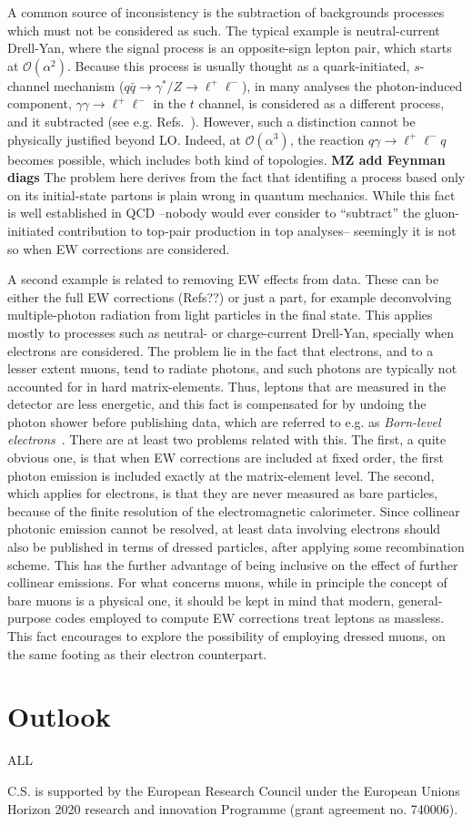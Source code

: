 \documentclass[a4paper,11pt]{article}
\begin{document}
A common source of inconsistency is the subtraction of backgrounds processes which must not be considered as such. The typical example
is neutral-current Drell-Yan, where the signal process is an opposite-sign lepton pair, which starts
at $\mathcal O(\alpha^2)$. Because this process is usually thought
as a quark-initiated, $s$-channel mechanism ($q\bar q \to \gamma^*/Z \to \ell^+ \ell^-$), in many analyses the photon-induced component,
$\gamma \gamma \to \ell^+ \ell^-$ in the $t$ channel, is considered as a different process, and it 
subtracted (see e.g. Refs.~\cite{}). However, such a distinction cannot be physically
justified beyond LO. Indeed, at $\mathcal O(\alpha^3)$, the reaction $q \gamma \to \ell^+ \ell^- q$ becomes possible, which
includes both kind of topologies. {\bf MZ add Feynman diags} The problem here derives from the fact 
that identifing a process based only on its 
initial-state partons is plain wrong in quantum mechanics. While this fact is well established in QCD --nobody would ever 
consider to ``subtract'' the gluon-initiated contribution to top-pair production in top analyses-- seemingly it is not so
when EW corrections are considered.

A second example is related to removing EW effects from data. These can be either the full EW corrections (Refs??) 
or just a part, for example deconvolving multiple-photon radiation from light particles in the final state. This applies mostly
to processes such as neutral- or charge-current Drell-Yan, specially when electrons are considered. The problem lie in the fact that
 electrons, and to a lesser extent muons, tend to radiate photons, and such photons are typically not accounted
for in hard matrix-elements. Thus, leptons that are measured in the detector are less energetic, and this fact is compensated for
by undoing the photon shower before publishing data, which are referred to e.g. as \emph{Born-level electrons}~\cite{}. There are 
at least two 
problems related with this. The first, a quite obvious one, is that when EW corrections
are included at fixed order, the first photon emission is included exactly at the matrix-element level. The second, which
applies for electrons, is that they are never measured as bare particles, because of the finite resolution 
of the electromagnetic calorimeter. Since collinear photonic emission cannot be resolved, at least data 
involving electrons should also be published
in terms of dressed particles, after applying some recombination scheme. This has the further advantage of being 
inclusive on the effect of further collinear emissions. For what concerns muons, while in principle
the concept of bare muons is a physical one, it should be kept in mind that modern, general-purpose codes employed to
compute EW corrections treat leptons as massless. This fact encourages to explore the possibility of employing dressed
muons, on the same footing as their electron counterpart.

\section{Outlook}

ALL

\cite{Carli:2010rw}
\cite{Bertone:2014zva}

\appendix

\acknowledgments

C.S. is supported by the European Research Council under the European Unions Horizon 2020 research and innovation Programme (grant agreement no. 740006).



\end{document}
